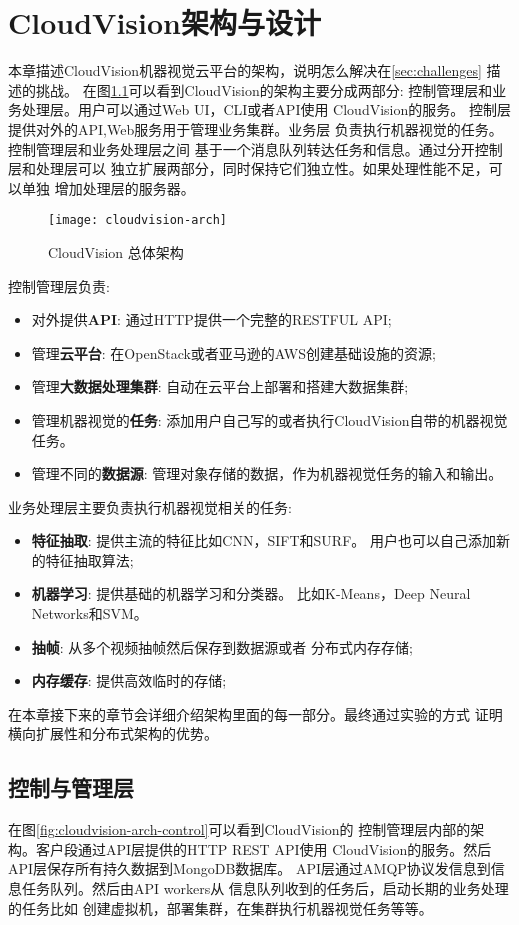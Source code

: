 \chapter{CloudVision架构与设计}
\label{cha:architecture}
本章描述CloudVision机器视觉云平台的架构，说明怎么解决在\ref{sec:challenges}
描述的挑战。
在图\ref{fig:cloudvision-arch}可以看到CloudVision的架构主要分成两部分:
控制管理层和业务处理层。用户可以通过Web UI，CLI或者API使用
CloudVision的服务。 控制层提供对外的API,Web服务用于管理业务集群。业务层
负责执行机器视觉的任务。控制管理层和业务处理层之间
基于一个消息队列转达任务和信息。通过分开控制层和处理层可以
独立扩展两部分，同时保持它们独立性。如果处理性能不足，可以单独
增加处理层的服务器。
\begin{figure}[H]
  \centering
  \texttt{[image: cloudvision-arch]}
  \caption{CloudVision 总体架构}
  \label{fig:cloudvision-arch}
\end{figure}

控制管理层负责:
\begin{itemize}
  \item 对外提供\textbf{API}: 通过HTTP提供一个完整的RESTFUL API;
  \item 管理\textbf{云平台}: 在OpenStack或者亚马逊的AWS创建基础设施的资源;
  \item 管理\textbf{大数据处理集群}: 自动在云平台上部署和搭建大数据集群;
  \item 管理机器视觉的\textbf{任务}: 添加用户自己写的或者执行CloudVision自带的机器视觉任务。
  \item 管理不同的\textbf{数据源}: 管理对象存储的数据，作为机器视觉任务的输入和输出。
\end{itemize}
业务处理层主要负责执行机器视觉相关的任务:
\begin{itemize}
  \item \textbf{特征抽取}: 提供主流的特征比如CNN，SIFT和SURF。
        用户也可以自己添加新的特征抽取算法;
  \item \textbf{机器学习}: 提供基础的机器学习和分类器。
        比如K-Means，Deep Neural Networks和SVM。
  \item \textbf{抽帧}: 从多个视频抽帧然后保存到数据源或者
        分布式内存存储;
  \item \textbf{内存缓存}: 提供高效临时的存储;
\end{itemize}

在本章接下来的章节会详细介绍架构里面的每一部分。最终通过实验的方式
证明横向扩展性和分布式架构的优势。


\section{控制与管理层}
\label{sec:arch_control}
在图\ref{fig:cloudvision-arch-control}可以看到CloudVision的
控制管理层内部的架构。客户段通过API层提供的HTTP REST API使用
CloudVision的服务。然后API层保存所有持久数据到MongoDB数据库。
API层通过AMQP协议发信息到信息任务队列。然后由API workers从
信息队列收到的任务后，启动长期的业务处理的任务比如
创建虚拟机，部署集群，在集群执行机器视觉任务等等。

